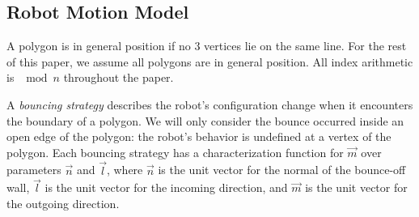\documentclass[letterpaper, 10 pt, conference]{ieeeconf}  %
\begin{document}
\subsection{Robot Motion Model}\label{subsec:bounce_strategy}

A polygon is in general position if no $3$ vertices lie on the same line. For the rest of this paper, we assume all polygons are in general position. All index arithmetic is $\mod n$ throughout the paper.

A \emph{bouncing strategy} describes the robot's configuration change when it encounters the boundary of a polygon. We will only consider the bounce occurred inside an open edge of the polygon: the robot's behavior is undefined at a vertex of the polygon. Each bouncing strategy has a characterization function for $\vec{m}$ over parameters $\vec{n}$ and $\vec{l}$, where $\vec{n}$ is the unit vector for the normal of the bounce-off wall, $\vec{l}$ is the unit vector for the incoming direction, and $\vec{m}$ is the unit vector for the outgoing direction.
\end{document}
